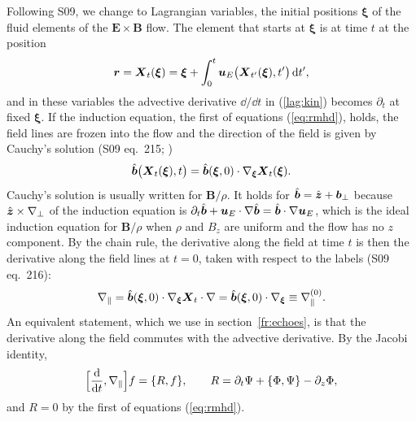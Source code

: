 Following S09, we change to Lagrangian variables, the initial positions $\boldsymbol\xi$ of the fluid elements of the $\boldsymbol E\times\boldsymbol B$ flow. The element that starts at $\boldsymbol\xi$ is at time $t$ at the position
\begin{equation}\label{lag:map}
  \boldsymbol r=\boldsymbol X_t(\boldsymbol\xi)=\boldsymbol\xi+\int_0^t\boldsymbol u_E\big(\boldsymbol X_{t'}(\boldsymbol\xi),t'\big)\,\mathrm{d} t' ,
\end{equation}
and in these variables the advective derivative $\dd/\dd t$ in (\ref{lag:kin}) becomes $\partial_t$ at fixed $\boldsymbol\xi$. If the induction equation, the first of equations (\ref{eq:rmhd}), holds, the field lines are frozen into the flow and the direction of the field is given by Cauchy's solution (S09 eq.~215; \citealt[example~3]{Webb2014})
\begin{equation}\label{lag:cauchy}
  \hat{\boldsymbol b}\big(\boldsymbol X_t(\boldsymbol\xi),t\big)=\hat{\boldsymbol b}(\boldsymbol\xi,0)\cdot\nabla_{\boldsymbol\xi}\boldsymbol X_t(\boldsymbol\xi) .
\end{equation}
Cauchy's solution is usually written for $\boldsymbol B/\rho$. It holds for $\hat{\boldsymbol b}=\hat{\boldsymbol z}+\boldsymbol b_\perp$ because $\hat{\boldsymbol z}\times\nabla_\perp$ of the induction equation is $\partial_t\hat{\boldsymbol b}+\boldsymbol u_E\cdot\nabla\hat{\boldsymbol b}=\hat{\boldsymbol b}\cdot\nabla\boldsymbol u_E$, which is the ideal induction equation for $\boldsymbol B/\rho$ when $\rho$ and $B_z$ are uniform and the flow has no $z$ component. By the chain rule, the derivative along the field at time $t$ is then the derivative along the field lines at $t=0$, taken with respect to the labels (S09 eq.~216):
\begin{equation}\label{lag:intertwine}
  \nabla_\parallel=\hat{\boldsymbol b}(\boldsymbol\xi,0)\cdot\nabla_{\boldsymbol\xi}\boldsymbol X_t\cdot\nabla=\hat{\boldsymbol b}(\boldsymbol\xi,0)\cdot\nabla_{\boldsymbol\xi}\equiv\nabla_\parallel^{(0)} .
\end{equation}
An equivalent statement, which we use in section~\ref{fr:echoes}, is that the derivative along the field commutes with the advective derivative. By the Jacobi identity,
\begin{equation}\label{lag:commutator}
  \Big[\frac{\mathrm{d}}{\mathrm{d} t},\nabla_\parallel\Big]f=\{R,f\},\qquad R=\partial_t\Psi+\{\Phi,\Psi\}-\partial_z\Phi ,
\end{equation}
and $R=0$ by the first of equations (\ref{eq:rmhd}).


